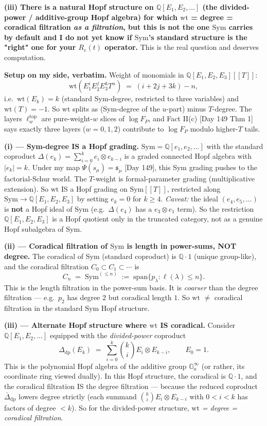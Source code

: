 \documentclass[11pt]{article}
\newcommand{\wt}{\mathrm{wt}}
\newcommand{\Sym}{\mathrm{Sym}}
\begin{document}
\textbf{(iii) There is a natural Hopf structure on $\mathbb{Q}[E_1,E_2,\ldots]$
(the divided-power / additive-group Hopf algebra) for which $\wt$ = degree =
coradical filtration \emph{as a filtration}, but this is not the one $\Sym$ carries
by default and I do not yet know if $\Sym$'s standard structure is the "right" one
for your $R_e(t)$ operator.} This is the real question and deserves computation.

\textbf{Setup on my side, verbatim.} Weight of monomials in
$\mathbb{Q}[E_1,E_2,E_3][[T]]$:
\begin{equation}
\wt(E_1^{i} E_2^{j} E_3^{k} T^n) \;=\; (i + 2j + 3k) - n,
\end{equation}
i.e.\ $\wt(E_k) = k$ (standard $\Sym$-degree, restricted to three variables) and
$\wt(T) = -1$. So $\wt$ splits as (Sym-degree of the $u$-part) minus $T$-degree.
The layers $\ell^{\mathrm{top}}_w$ are pure-weight-$w$ slices of $\log F_P$, and
Fact II(c) [Day 149 Thm 1] says exactly three layers ($w = 0, 1, 2$) contribute to
$\log F_P$ modulo higher-$T$ tails.

\textbf{(i) --- Sym-degree IS a Hopf grading.}
$\Sym = \mathbb{Q}[e_1, e_2, \ldots]$ with the standard coproduct
$\Delta(e_k) = \sum_{i=0}^{k} e_i \otimes e_{k-i}$ is a graded connected Hopf
algebra with $|e_k| = k$. Under my map $\Psi(s_\mu) = \mathfrak{s}_\mu$ [Day 149],
this Sym grading pushes to the factorial-Schur world. The $T$-weight is
formal-parameter grading (multiplicative extension). So $\wt$ IS a Hopf grading on
$\Sym[[T]]$, restricted along $\Sym \to \mathbb{Q}[E_1,E_2,E_3]$ by setting $e_k = 0$
for $k \ge 4$. \emph{Caveat:} the ideal $(e_4, e_5, \ldots)$ is \textbf{not} a Hopf
ideal of $\Sym$ (e.g.\ $\Delta(e_4)$ has a $e_3 \otimes e_1$ term). So the
restriction $\mathbb{Q}[E_1,E_2,E_3]$ is a Hopf quotient only in the truncated
category, not as a genuine Hopf subalgebra of $\Sym$.

\textbf{(ii) --- Coradical filtration of $\Sym$ is length in power-sums,
NOT degree.} The coradical of $\Sym$ (standard coproduct) is $\mathbb{Q} \cdot 1$
(unique group-like), and the coradical filtration
$C_0 \subset C_1 \subset \cdots$ is
\[
C_n \;=\; \Sym^{(\le n)} \;:=\; \mathrm{span}\{p_\lambda : \ell(\lambda) \le n\}.
\]
This is the length filtration in the power-sum basis. It is \emph{coarser} than
the degree filtration --- e.g.\ $p_2$ has degree $2$ but coradical length $1$.
So $\wt$ $\ne$ coradical filtration in the standard $\Sym$ Hopf structure.

\textbf{(iii) --- Alternate Hopf structure where $\wt$ IS coradical.}
Consider $\mathbb{Q}[E_1, E_2, \ldots]$ equipped with the \emph{divided-power}
coproduct
\[
\Delta_{\mathrm{dp}}(E_k) \;=\; \sum_{i=0}^{k} \binom{k}{i} E_i \otimes E_{k-i},
\qquad E_0 = 1.
\]
This is the polynomial Hopf algebra of the additive group $\mathbb{G}_a^{\infty}$
(or rather, its coordinate ring viewed dually). In this Hopf structure, the
coradical is $\mathbb{Q} \cdot 1$, and the coradical filtration IS the degree
filtration --- because the reduced coproduct $\bar\Delta_{\mathrm{dp}}$ lowers
degree strictly (each summand $\binom{k}{i} E_i \otimes E_{k-i}$ with
$0 < i < k$ has factors of degree $< k$). So for the divided-power structure,
\emph{$\wt$ = degree = coradical filtration}.
\end{document}
